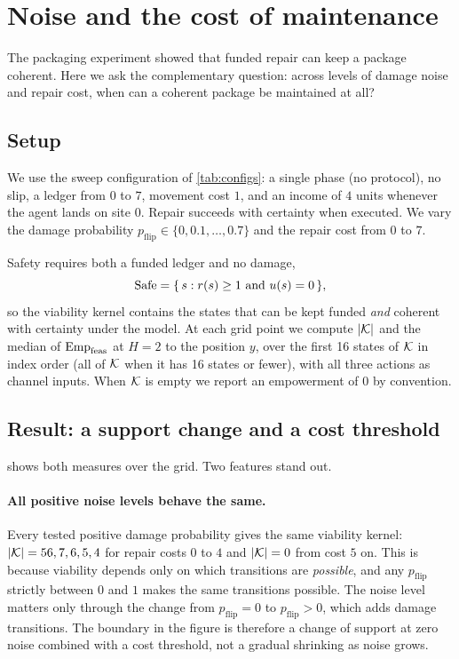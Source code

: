\section{Noise and the cost of maintenance}
\label{sec:ex_sweep}

The packaging experiment showed that funded repair can keep a package coherent. Here we ask the complementary question: across levels of damage noise and repair cost, when can a coherent package be maintained at all?

\subsection{Setup}
We use the sweep configuration of \cref{tab:configs}: a single phase (no protocol), no slip, a ledger from $0$ to $7$, movement cost $1$, and an income of $4$ units whenever the agent lands on site $0$. Repair succeeds with certainty when executed. We vary the damage probability $p_{\mathrm{flip}}\in\{0,0.1,\dots,0.7\}$ and the repair cost from $0$ to $7$.

Safety requires both a funded ledger and no damage,
\[
\mathrm{Safe} = \{\, s : r(s)\ge 1 \ \text{and}\ u(s)=0 \,\},
\]
so the viability kernel contains the states that can be kept funded \emph{and} coherent with certainty under the model. At each grid point we compute $|\mathcal{K}|$ and the median of $\mathrm{Emp}_{\mathrm{feas}}$ at $H=2$ to the position $y$, over the first 16 states of $\mathcal{K}$ in index order (all of $\mathcal{K}$ when it has 16 states or fewer), with all three actions as channel inputs. When $\mathcal{K}$ is empty we report an empowerment of $0$ by convention.

\subsection{Result: a support change and a cost threshold}
 shows both measures over the grid. Two features stand out.

\paragraph{All positive noise levels behave the same.}
Every tested positive damage probability gives the same viability kernel: $|\mathcal{K}| = 56, 7, 6, 5, 4$ for repair costs $0$ to $4$ and $|\mathcal{K}|=0$ from cost $5$ on. This is because viability depends only on which transitions are \emph{possible}, and any $p_{\mathrm{flip}}$ strictly between $0$ and $1$ makes the same transitions possible. The noise level matters only through the change from $p_{\mathrm{flip}}=0$ to $p_{\mathrm{flip}}>0$, which adds damage transitions. The boundary in the figure is therefore a change of support at zero noise combined with a cost threshold, not a gradual shrinking as noise grows.


